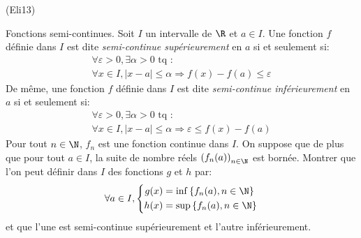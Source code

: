 \begin{tiny}(Eli13)\end{tiny} Fonctions semi-continues.\newline
Soit $I$ un intervalle de $\R$ et $a\in I$. Une fonction $f$ définie dans $I$ est dite \emph{semi-continue supérieurement} en $a$ si et seulement si:
\begin{multline*}
\forall \varepsilon >0, \exists \alpha >0 \text{ tq }:\\
\forall x\in I, \left|x-a\right| \leq \alpha \Rightarrow f(x) - f(a) \leq \varepsilon
\end{multline*}
De même, une fonction $f$ définie dans $I$ est dite \emph{semi-continue inférieurement} en $a$ si et seulement si:
\begin{multline*}
\forall \varepsilon >0, \exists \alpha >0 \text{ tq }:\\
\forall x\in I, \left|x-a\right| \leq \alpha \Rightarrow \varepsilon \leq f(x) - f(a)
\end{multline*}
Pour tout $n\in \N$, $f_n$ est une fonction continue dans $I$. On suppose que de plus que pour tout $a\in I$, la suite de nombre réels $\left( f_n(a)\right)_{n\in \N}$ est bornée.\newline
Montrer que l'on peut définir dans $I$ des fonctions $g$ et $h$ par:
\begin{displaymath}
\forall a\in I,
\left\lbrace 
\begin{aligned}
  g(x) &= \inf\left\lbrace f_n(a), n\in \N\right\rbrace \\
  h(x) &= \sup\left\lbrace f_n(a), n\in \N\right\rbrace
\end{aligned}
\right. 
\end{displaymath}
et que l'une est semi-continue supérieurement et l'autre inférieurement.